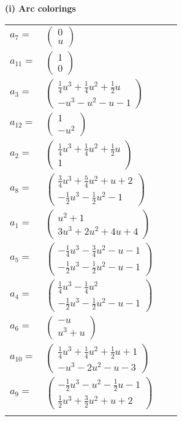 \documentclass[1p]{elsarticle_modified}
\theoremstyle{definition}
\begin{document}
\flushleft \textbf{(i) Arc colorings}\\
\begin{tabular}{m{7pt} m{180pt} m{7pt} m{180pt} }
\flushright $a_{7}=$&$\begin{pmatrix}0\\u\end{pmatrix}$ \\
\flushright $a_{11}=$&$\begin{pmatrix}1\\0\end{pmatrix}$ \\
\flushright $a_{3}=$&$\begin{pmatrix}\frac{1}{4} u^3+\frac{1}{4} u^2+\frac{1}{2} u\\- u^3- u^2- u-1\end{pmatrix}$ \\
\flushright $a_{12}=$&$\begin{pmatrix}1\\- u^2\end{pmatrix}$ \\
\flushright $a_{2}=$&$\begin{pmatrix}\frac{1}{4} u^3+\frac{1}{4} u^2+\frac{1}{2} u\\1\end{pmatrix}$ \\
\flushright $a_{8}=$&$\begin{pmatrix}\frac{3}{4} u^3+\frac{5}{4} u^2+u+2\\-\frac{1}{2} u^3-\frac{1}{2} u^2-1\end{pmatrix}$ \\
\flushright $a_{1}=$&$\begin{pmatrix}u^2+1\\3 u^3+2 u^2+4 u+4\end{pmatrix}$ \\
\flushright $a_{5}=$&$\begin{pmatrix}-\frac{1}{4} u^3-\frac{3}{4} u^2- u-1\\-\frac{1}{2} u^3-\frac{1}{2} u^2- u-1\end{pmatrix}$ \\
\flushright $a_{4}=$&$\begin{pmatrix}\frac{1}{4} u^3-\frac{1}{4} u^2\\-\frac{1}{2} u^3-\frac{1}{2} u^2- u-1\end{pmatrix}$ \\
\flushright $a_{6}=$&$\begin{pmatrix}- u\\u^3+u\end{pmatrix}$ \\
\flushright $a_{10}=$&$\begin{pmatrix}\frac{1}{4} u^3+\frac{1}{4} u^2+\frac{1}{2} u+1\\- u^3-2 u^2- u-3\end{pmatrix}$ \\
\flushright $a_{9}=$&$\begin{pmatrix}-\frac{1}{2} u^3- u^2-\frac{1}{2} u-1\\\frac{1}{2} u^3+\frac{3}{2} u^2+u+2\end{pmatrix}$\\&\end{tabular}
\end{document}
